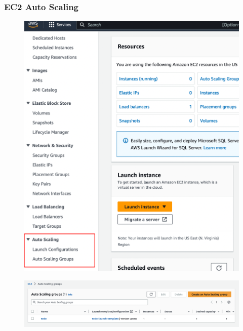 \documentclass{csse4400}
\begin{document}
\subsubsection{EC2 Auto Scaling}


\begin{figure}[H]
  \begin{center}
    \includegraphics[scale=0.5]{images/ec2_1}
  \end{center}
\end{figure}

\begin{figure}[H]
  \begin{center}
    \includegraphics[width=\textwidth]{images/ec2_3}
  \end{center}
\end{figure}
\end{document}
